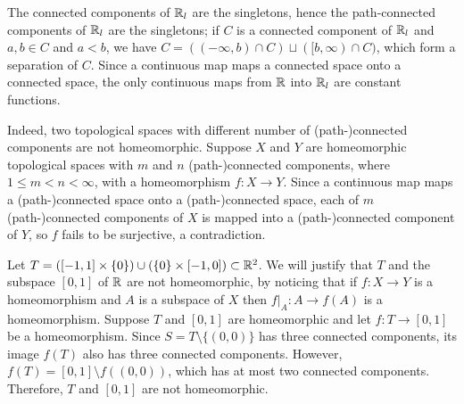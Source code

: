\begin{exmp}
    The connected components of ${\mathbb{R}}_l$ are the singletons, hence the path-connected components of ${\mathbb{R}}_l$ are the singletons; if $C$ is a connected component of ${\mathbb{R}}_l$ and $a, b\in C$ and $a<b$, we have $C=((-\infty, b)\cap C)\sqcup([b, \infty)\cap C)$, which form a separation of $C$.
    Since a continuous map maps a connected space onto a connected space, the only continuous maps from ${\mathbb{R}}$ into ${\mathbb{R}}_l$ are constant functions.
\end{exmp}
\begin{exmp}
    Indeed, two topological spaces with different number of (path-)connected components are not homeomorphic.
    Suppose $X$ and $Y$ are homeomorphic topological spaces with $m$ and $n$ (path-)connected components, where $1\leq m<n<\infty$, with a homeomorphism $f: X\rightarrow Y$.
    Since a continuous map maps a (path-)connected space onto a (path-)connected space, each of $m$ (path-)connected components of $X$ is mapped into a (path-)connected component of $Y$, so $f$ fails to be surjective, a contradiction.
\end{exmp}
\begin{exmp}
    Let $T=([-1, 1]\times\{0\})\cup(\{0\}\times[-1, 0])\subset {\mathbb{R}}^2$.
    We will justify that $T$ and the subspace $[0, 1]$ of ${\mathbb{R}}$ are not homeomorphic, by noticing that if $f: X\rightarrow Y$ is a homeomorphism and $A$ is a subspace of $X$ then $f|_A: A\rightarrow f(A)$ is a homeomorphism.
    Suppose $T$ and $[0, 1]$ are homeomorphic and let $f: T\rightarrow [0, 1]$ be a homeomorphism.
    Since $S=T\setminus\{(0, 0)\}$ has three connected components, its image $f(T)$ also has three connected components.
    However, $f(T)=[0, 1]\setminus f((0, 0))$, which has at most two connected components.
    Therefore, $T$ and $[0, 1]$ are not homeomorphic.
\end{exmp}